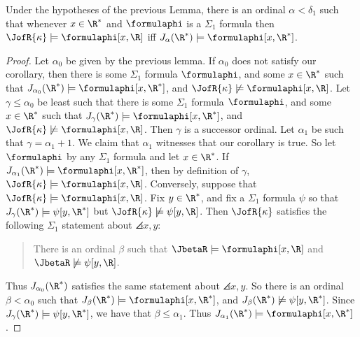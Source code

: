 \begin{corollary}
\label{Is_Correct}
Under the hypotheses of the previous Lemma,
there is an ordinal $\alpha<\delta_1$
such that whenever $x\in\R^*$ and $\formulaphi$ is a $\Sigma_1$ formula
then $\JofR{\kappa}\models\formulaphi[x,\R]$ iff
 $J_{\alpha}(\R^*)\models\formulaphi[x,\R^*]$.
\end{corollary}
\begin{proof}
Let $\alpha_0$ be given by the previous lemma. If $\alpha_0$ does not
satisfy our corollary, then there is some $\Sigma_1$ formula $\formulaphi$,
and some $x\in\R^*$ such that
$J_{\alpha_0}(\R^*)\models\formulaphi[x,\R^*]$, and
$\JofR{\kappa}\not\models\formulaphi[x,\R]$. Let
$\gamma\leq\alpha_0$ be least such that there is some $\Sigma_1$ formula
$\formulaphi$, and some $x\in\R^*$ such that
$J_{\gamma}(\R^*)\models\formulaphi[x,\R^*]$, and
$\JofR{\kappa}\not\models\formulaphi[x,\R]$. Then $\gamma$ is a
successor ordinal. Let $\alpha_1$ be such that $\gamma=\alpha_1+1$.
We claim that $\alpha_1$ witnesses that our corollary is true. So let
$\formulaphi$ by any $\Sigma_1$ formula and let $x\in\R^*$. If
$J_{\alpha_1}(\R^*)\models\formulaphi[x,\R^*]$, then by definition of
$\gamma$, $\JofR{\kappa}\models\formulaphi[x,\R]$. Conversely,
suppose that $\JofR{\kappa}\models\formulaphi[x,\R]$. Fix
$y\in\R^*$, and fix a $\Sigma_1$ formula $\psi$ so that
$J_{\gamma}(\R^*)\models\psi[y,\R^*]$ but
$\JofR{\kappa}\not\models\psi[y,\R]$. Then $\JofR{\kappa}$ satisfies
the following $\Sigma_1$ statement about $\angles{x,y}$:
\begin{quote}
There is an ordinal $\beta$ such that $\JbetaR\models\formulaphi[x,\R]$
and $\JbetaR\not\models\psi[y,\R]$.
\end{quote}
Thus $J_{\alpha_0}(\R^*)$ satisfies the same statement about $\angles{x,y}$.
 So there is an
ordinal $\beta<\alpha_0$ such that
$J_{\beta}(\R^*)\models\formulaphi[x,\R^*]$, and
$J_{\beta}(\R^*)\not\models\psi[y,\R^*]$. Since
$J_{\gamma}(\R^*)\models\psi[y,\R^*]$, we have that $\beta\leq\alpha_1$.
Thus
$J_{\alpha_1}(\R^*)\models\formulaphi[x,\R^*]$.
\end{proof}

